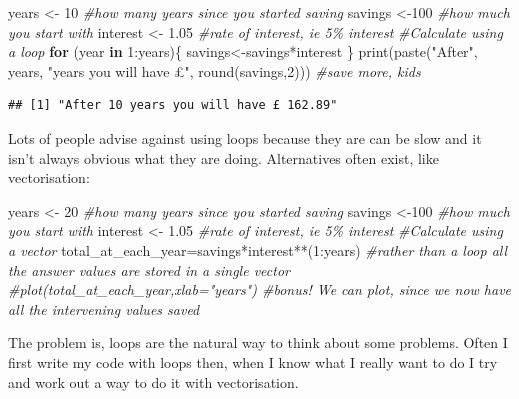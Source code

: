 \documentclass[
  12pt,
  a5paper,
]{book}
\newenvironment{Shaded}{\begin{snugshade}}{\end{snugshade}}
\newcommand{\CommentTok}[1]{\textcolor[rgb]{0.56,0.35,0.01}{\textit{#1}}}
\newcommand{\ControlFlowTok}[1]{\textcolor[rgb]{0.13,0.29,0.53}{\textbf{#1}}}
\newcommand{\DecValTok}[1]{\textcolor[rgb]{0.00,0.00,0.81}{#1}}
\newcommand{\FloatTok}[1]{\textcolor[rgb]{0.00,0.00,0.81}{#1}}
\newcommand{\FunctionTok}[1]{\textcolor[rgb]{0.00,0.00,0.00}{#1}}
\newcommand{\NormalTok}[1]{#1}
\newcommand{\OtherTok}[1]{\textcolor[rgb]{0.56,0.35,0.01}{#1}}
\newcommand{\SpecialCharTok}[1]{\textcolor[rgb]{0.00,0.00,0.00}{#1}}
\newcommand{\StringTok}[1]{\textcolor[rgb]{0.31,0.60,0.02}{#1}}
\begin{document}
\begin{Shaded}
\begin{Highlighting}[]
\NormalTok{years }\OtherTok{\textless{}{-}} \DecValTok{10} \CommentTok{\#how many years since you started saving}
\NormalTok{savings }\OtherTok{\textless{}{-}}\DecValTok{100} \CommentTok{\#how much you start with}
\NormalTok{interest }\OtherTok{\textless{}{-}} \FloatTok{1.05} \CommentTok{\#rate of interest, ie 5\% interest}
\CommentTok{\#Calculate using a loop}
\ControlFlowTok{for}\NormalTok{ (year }\ControlFlowTok{in} \DecValTok{1}\SpecialCharTok{:}\NormalTok{years)\{}
\NormalTok{  savings}\OtherTok{\textless{}{-}}\NormalTok{savings}\SpecialCharTok{*}\NormalTok{interest}
\NormalTok{\}}
\FunctionTok{print}\NormalTok{(}\FunctionTok{paste}\NormalTok{(}\StringTok{"After"}\NormalTok{, years, }\StringTok{"years you will have £"}\NormalTok{, }\FunctionTok{round}\NormalTok{(savings,}\DecValTok{2}\NormalTok{))) }\CommentTok{\#save more, kids}
\end{Highlighting}
\end{Shaded}

\begin{verbatim}
## [1] "After 10 years you will have £ 162.89"
\end{verbatim}

Lots of people advise against using loops because they are can be slow and it isn't always obvious what they are doing. Alternatives often exist, like vectorisation:

\begin{Shaded}
\begin{Highlighting}[]
\NormalTok{years }\OtherTok{\textless{}{-}} \DecValTok{20} \CommentTok{\#how many years since you started saving}
\NormalTok{savings }\OtherTok{\textless{}{-}}\DecValTok{100} \CommentTok{\#how much you start with}
\NormalTok{interest }\OtherTok{\textless{}{-}} \FloatTok{1.05} \CommentTok{\#rate of interest, ie 5\% interest}
\CommentTok{\#Calculate using a vector}
\NormalTok{total\_at\_each\_year}\OtherTok{=}\NormalTok{savings}\SpecialCharTok{*}\NormalTok{interest}\SpecialCharTok{**}\NormalTok{(}\DecValTok{1}\SpecialCharTok{:}\NormalTok{years) }\CommentTok{\#rather than a loop all the answer values are stored in a single vector}
\CommentTok{\#plot(total\_at\_each\_year,xlab="years") \#bonus! We can plot, since we now have all the intervening values saved}
\end{Highlighting}
\end{Shaded}

The problem is, loops are the natural way to think about some problems. Often I first write my code with loops then, when I know what I really want to do I try and work out a way to do it with vectorisation.
\end{document}
